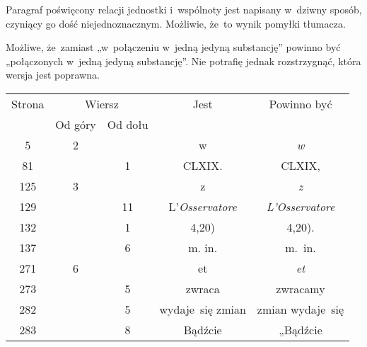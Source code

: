 \documentclass[a4paper,11pt]{article}
\begin{document}
\vspace{\spaceFour}





\noindent
{} Paragraf poświęcony relacji jednostki i~wspólnoty jest napisany
w~dziwny sposób, czyniący go dość niejednoznacznym. Możliwie, że~to wynik
pomyłki tłumacza.

\vspace{\spaceFour}





\noindent
{} Możliwe, że~zamiast „w~połączeniu w~jedną jedyną substancję”
powinno być „połączonych w~jedną jedyną substancję”. Nie potrafię jednak
rozstrzygnąć, która wersja jest poprawna.






\newpage



\begin{center}

  \begin{tabular}{|c|c|c|c|c|}
    \hline
    Strona & \multicolumn{2}{c|}{Wiersz} & Jest
                              & Powinno być \\ \cline{2-3}
    & Od góry & Od dołu & & \\
    \hline
    \hphantom{00}5 & \hphantom{0}2 & & w & \textit{w} \\
    \hphantom{0}81 & & \hphantom{0}1 & CLXIX. & CLXIX, \\
    125 & \hphantom{0}3 & & z & \textit{z} \\
    129 & & 11 & L'\textit{Osservatore} & \textit{L'Osservatore} \\
    132 & & \hphantom{0}1 & 4,20) & 4,20). \\
    137 & & \hphantom{0}6 & m.\hspace{1em} in. & m.~in.\\
    271 & \hphantom{0}6 & & et & \textit{et} \\
    273 & & \hphantom{0}5 & zwraca & zwracamy \\
    282 & & \hphantom{0}5 & wydaje~się zmian & zmian wydaje~się \\
    283 & & \hphantom{0}8 & Bądźcie & „Bądźcie \\
    \hline
  \end{tabular}

\end{center}
\end{document}
